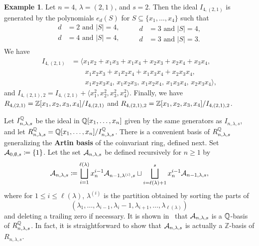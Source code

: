 \documentclass[11pt]{amsart}
\theoremstyle{definition}
\newtheorem{example}[theorem]{Example}
\newcommand{\la}{\lambda}
\begin{document}
\begin{example}
Let $n=4$, $\lambda = (2,1)$, and $s=2$. Then the ideal $I_{4,(2,1)}$ is generated by the polynomials 
$e_d(S)$ for $S\subseteq \{x_1,\dots, x_4\}$ such that
\begin{equation*}
\begin{aligned}
	d &= 2 \text{ and }|S| = 4,\\
	d &= 4\text{ and }|S| = 4,\\
\end{aligned}
\qquad
\begin{aligned}
	d &= 3\text{ and }|S| = 4,\\
	d &= 3\text{ and }|S| = 3.
\end{aligned}
\end{equation*}
We have
\begin{align*}
    I_{4,(2,1)} 
    &= \big\langle x_1x_2+x_1x_3+x_1x_4+x_2x_3+x_2x_4+x_3x_4,\\
    &\qquad x_1x_2x_3+x_1x_2x_4+x_1x_3x_4+x_2x_3x_4,\\ 
    &\qquad x_1x_2x_3x_4,\, x_1x_2x_3,\, x_1x_2x_4,\, x_1x_3x_4,\, x_2x_3x_4\big\rangle,
\end{align*}
and $I_{4,(2,1),2} = I_{4,(2,1)} + \langle x_1^2,x_2^2,x_3^2,x_4^2\rangle$. Finally, we have  $R_{4,(2,1)} = \mathbb{Z}[x_1,x_2,x_3,x_4]/I_{4,(2,1)}$ and $R_{4,(2,1),2} = \mathbb{Z}[x_1,x_2,x_3,x_4]/I_{4,(2,1),2}$.
\end{example}

Let $I_{n,\lambda,s}^{\mathbb{Q}}$ be the ideal in $\mathbb{Q}[x_1,\dots,x_n]$ given by the same generators as $I_{n,\lambda,s}$, and let $R_{n,\la,s}^\bQ = \bQ[x_1,\dots, x_n]/I_{n,\lambda,s}^\bQ$. 
There is a convenient basis of $R_{n,\la,s}^\bQ$ generalizing the \textbf{Artin basis} of the coinvariant ring, defined next. Set $\mathcal{A}_{0,\emptyset,s} \coloneqq \{1\}$. Let the set $\cA_{n,\la,s}$ be defined recursively for $n\geq 1$ by
\begin{align}
    \cA_{n,\la,s} \coloneqq \bigsqcup_{i=1}^{\ell(\la)} x_n^{i-1} \cA_{n-1,\la^{(i)},s} \sqcup \bigsqcup_{i=\ell(\la)+1}^s x_n^{i-1} \cA_{n-1,\la,s},
\end{align}
where for $1\leq i \leq \ell(\la)$, $\la^{(i)}$ is the partition obtained by sorting the parts of \[(\la_1,\dots, \la_{i-1},\la_i-1,\la_{i+1},\dots, \la_{\ell(\la)})\]
and deleting a trailing zero if necessary.
It is shown in~\cite[Theorem 3.18]{GriffinOSP} that $\cA_{n,\la,s}$ is a $\mathbb{Q}$-basis of $R_{n,\la,s}^\bQ$. In fact, it is straightforward to show that $\cA_{n,\la,s}$ is actually a $\mathbb{Z}$-basis of $R_{n,\la,s}$.
\end{document}
